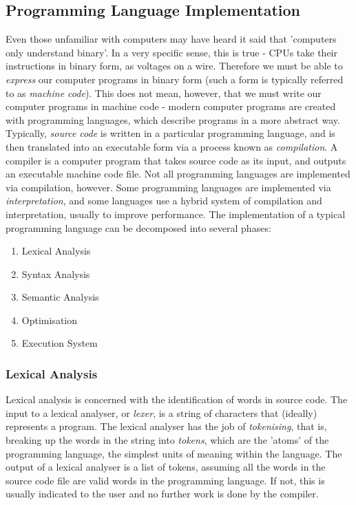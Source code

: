 \documentclass{article}
\begin{document}
\subsection{Programming Language Implementation}
Even those unfamiliar with computers may have heard it said that 'computers only understand binary'. In a very specific sense, this is true - CPUs take their instructions in binary form, as voltages on a wire. Therefore we must be able to \emph{express} our computer programs in binary form (such a form is typically referred to as \emph{machine code}). This does not mean, however, that we must write our computer programs in machine code - modern computer programs are created with programming languages, which describe programs in a more abstract way. Typically, \emph{source code} is written in a particular programming language, and is then translated into an executable form via a process known as \emph{compilation}. A compiler is a computer program that takes source code as its input, and outputs an executable machine code file. Not all programming languages are implemented via compilation, however. Some programming languages are implemented via \emph{interpretation}, and some languages use a hybrid system of compilation and interpretation, usually to improve performance. The implementation of a typical programming language can be decomposed into several phases: 
\begin{enumerate}
    \item Lexical Analysis
    \item Syntax Analysis
    \item Semantic Analysis
    \item Optimisation
    \item Execution System
\end{enumerate}

\subsubsection{Lexical Analysis}
Lexical analysis is concerned with the identification of words in source code. The input to a lexical analyser, or \emph{lexer}, is a string of characters that (ideally) represents a program. The lexical analyser has the job of \emph{tokenising}, that is, breaking up the words in the string into \emph{tokens}, which are the 'atoms' of the programming language, the simplest units of meaning within the language. The output of a lexical analyser is a list of tokens, assuming all the words in the source code file are valid words in the programming language. If not, this is usually indicated to the user and no further work is done by the compiler.
\end{document}
